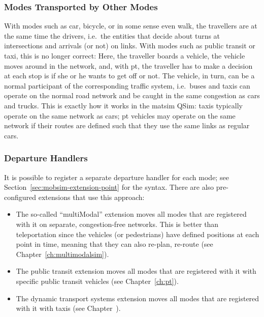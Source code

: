 \subsubsection{Modes Transported by Other Modes}


With modes such as car, bicycle, or in some sense even walk, the travellers are at the same time the drivers, i.e.\ the entities that decide about turns at intersections and arrivals (or not) on links.
%
With modes such as public transit or taxi, this is no longer correct: Here, the traveller boards a vehicle, the vehicle moves around in the network, and, with pt,  the traveller has to make a decision at each stop is if she or he wants to get off or not.  The vehicle, in turn, can be a normal participant of the corresponding traffic system, i.e.\ buses and taxis can operate on the normal road network and be caught in the same congestion as cars and trucks.  
%
This is exactly how it works in the \gls{matsim} QSim: taxis typically operate on the same network as cars; pt vehicles may operate on the same network if their routes are defined such that they use the same links as regular cars.


\subsubsection{Departure Handlers}
\label{sec:departure-handlers}
It is possible to register a separate departure handler for each mode; see Section~\ref{sec:mobsim-extension-point} for the syntax.  There are also pre-configured extensions that use this approach:
%
\begin{itemize}\styleItemize

\item The so-called ``multiModal'' extension moves all modes that are registered with it on separate, congestion-free networks.  This is better than \gls{teleportation} since the vehicles (or pedestrians) have defined positions at each point in time, meaning that they can also re-plan, \eg re-route (see Chapter~\ref{ch:multimodalsim}).

\item The public transit extension moves all modes that are registered with it with specific public transit vehicles (see Chapter~\ref{ch:pt}).

\item The dynamic transport systems extension moves all modes that are registered with it with taxis (see Chapter~\pageref{ch:dts}).

\end{itemize}

